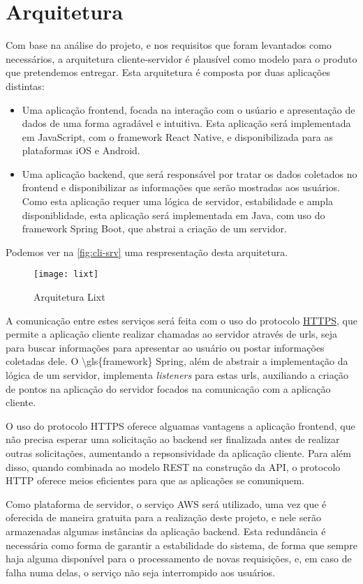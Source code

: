 \section{Arquitetura}

Com base na análise do projeto, e nos requisitos que foram levantados
como necessários, a arquitetura cliente-servidor é plausível como
modelo para o produto que pretendemos entregar.
Esta arquitetura é composta por duas aplicações distintas:
\begin{itemize}
\item Uma aplicação \gls{frontend}, focada na interação com o usúario
  e apresentação de dados de uma forma agradável e intuitiva. Esta
  aplicação será implementada em JavaScript, com o \gls{framework} React
  Native, e disponibilizada para as plataformas iOS e Android.
\item Uma aplicação \gls{backend}, que será responsável por tratar os
  dados coletados no \gls{frontend} e disponibilizar as informações
  que serão mostradas aos usuários. Como esta aplicação requer uma
  lógica de servidor, estabilidade e ampla disponiblidade, esta
  aplicação será implementada em Java, com uso do \gls{framework} Spring
  Boot, que abstrai a criação de um servidor.
\end{itemize}
Podemos ver na \autoref{fig:cli-srv} uma respresentação desta
arquitetura.

\begin{figure}[h]
  \centering
  \texttt{[image: lixt]}
  \caption{Arquitetura Lixt}
  \label{fig:cli-srv}
\end{figure}

A comunicação entre estes serviços será feita com o uso do protocolo
\label{sig:https}\hyperlink{s:http}{HTTPS}, que permite a aplicação
cliente realizar chamadas ao servidor através de urls, seja para
buscar informações para apresentar ao usuário ou postar informações
coletadas dele. O \gls{\gls{framework}} Spring, além de abstrair a implementação
da lógica de um servidor, implementa \emph{listeners} para estas urls,
auxiliando a criação de pontos na aplicação do servidor focados na
comunicação com a aplicação cliente.

O uso do protocolo HTTPS oferece alguamas vantagens a aplicação
\gls{frontend}, que não precisa esperar uma solicitação ao
\gls{backend} ser finalizada antes de realizar outras solicitações,
aumentando a repsonsividade da aplicação cliente. Para além disso,
quando combinada ao modelo \label{sig:rest}\gls{REST} na
construção da \label{sig:API}\gls{API}, o protocolo HTTP
oferece meios eficientes para que as aplicações se comuniquem.

Como plataforma de servidor, o serviço AWS será utilizado, uma vez que
é oferecida de maneira gratuita para a realização deste projeto, e nele
serão armazenadas algumas instâncias da aplicação \gls{backend}.
Esta redundância é necessária como forma de garantir a estabilidade do
sistema, de forma que sempre haja alguma disponível para o
processamento de novas requisições, e, em caso de falha numa delas, o
serviço não seja interrompido aos usuários.

